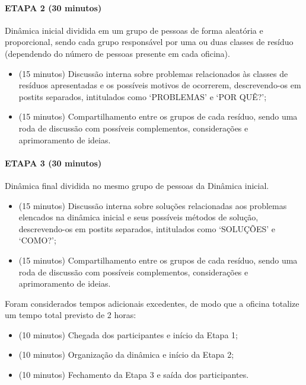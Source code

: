 	\paragraph{ETAPA 2 (30 minutos)} Dinâmica inicial dividida em um grupo de pessoas de forma aleatória e proporcional, sendo cada grupo responsável por uma ou duas classes de resíduo (dependendo do número de pessoas presente em cada oficina).
	\begin{itemize}
		\item (15 minutos) Discussão interna sobre problemas relacionados às classes de resíduos apresentadas e os possíveis motivos de ocorrerem, descrevendo-os em postits separados, intitulados como ‘PROBLEMAS’ e ‘POR QUÊ?’;
		\item (15 minutos) Compartilhamento entre os grupos de cada resíduo, sendo uma roda de discussão com possíveis complementos, considerações e aprimoramento de ideias.
	\end{itemize}
	
	\paragraph{ETAPA 3 (30 minutos)} Dinâmica final dividida no mesmo grupo de pessoas da Dinâmica inicial.
	
	\begin{itemize}
		\item (15 minutos) Discussão interna sobre soluções relacionadas aos problemas elencados na dinâmica inicial e seus possíveis métodos de solução, descrevendo-os em postits separados, intitulados como ‘SOLUÇÕES’ e ‘COMO?’;
		\item (15 minutos) Compartilhamento entre os grupos de cada resíduo, sendo uma roda de discussão com possíveis complementos, considerações e aprimoramento de ideias.
	\end{itemize}
	
	Foram considerados tempos adicionais excedentes, de modo que a oficina totalize um tempo total previsto de 2 horas:
	\begin{itemize}
		\item (10 minutos) Chegada dos participantes e início da Etapa 1;
		\item (10 minutos) Organização da dinâmica e início da Etapa 2;
		\item (10 minutos) Fechamento da Etapa 3 e saída dos participantes.
	\end{itemize}
	
	
	
